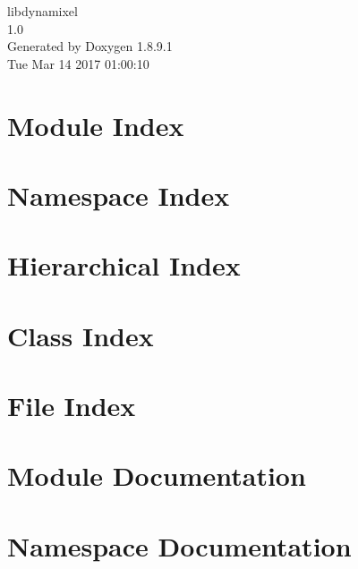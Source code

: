 \documentclass[twoside]{book}
\newcommand{\+}{\discretionary{\mbox{\scriptsize$\hookleftarrow$}}{}{}}
\newcommand{\clearemptydoublepage}{%
  \newpage{\pagestyle{empty}\cleardoublepage}%
}
\begin{document}
\hypersetup{pageanchor=false,
             bookmarks=true,
             bookmarksnumbered=true,
             pdfencoding=unicode
            }
\begin{titlepage}
\vspace*{7cm}
\begin{center}%
{\Large libdynamixel \\[1ex]\large 1.\+0 }\\
\vspace*{1cm}
{\large Generated by Doxygen 1.8.9.1}\\
\vspace*{0.5cm}
{\small Tue Mar 14 2017 01:00:10}\\
\end{center}
\end{titlepage}
\clearemptydoublepage
\tableofcontents
\clearemptydoublepage
{}
\hypersetup{pageanchor=true}

\chapter{Module Index}

\chapter{Namespace Index}

\chapter{Hierarchical Index}

\chapter{Class Index}

\chapter{File Index}

\chapter{Module Documentation}


\chapter{Namespace Documentation}







\end{document}
